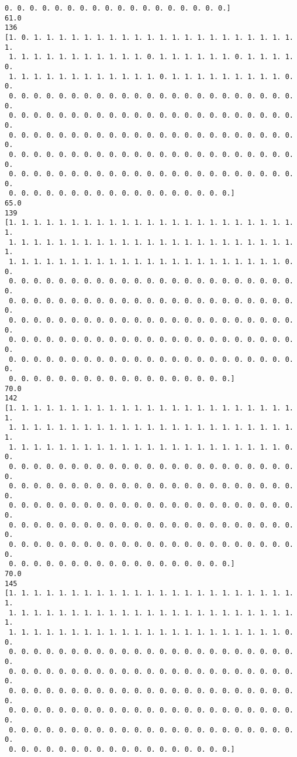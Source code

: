 \documentclass[11pt]{article}
\begin{document}
\begin{Verbatim}[commandchars=\\\{\}]
 0. 0. 0. 0. 0. 0. 0. 0. 0. 0. 0. 0. 0. 0. 0. 0. 0. 0.]
61.0
136
[1. 0. 1. 1. 1. 1. 1. 1. 1. 1. 1. 1. 1. 1. 1. 1. 1. 1. 1. 1. 1. 1. 1. 1.
 1. 1. 1. 1. 1. 1. 1. 1. 1. 1. 1. 0. 1. 1. 1. 1. 1. 1. 0. 1. 1. 1. 1. 0.
 1. 1. 1. 1. 1. 1. 1. 1. 1. 1. 1. 1. 0. 1. 1. 1. 1. 1. 1. 1. 1. 1. 0. 0.
 0. 0. 0. 0. 0. 0. 0. 0. 0. 0. 0. 0. 0. 0. 0. 0. 0. 0. 0. 0. 0. 0. 0. 0.
 0. 0. 0. 0. 0. 0. 0. 0. 0. 0. 0. 0. 0. 0. 0. 0. 0. 0. 0. 0. 0. 0. 0. 0.
 0. 0. 0. 0. 0. 0. 0. 0. 0. 0. 0. 0. 0. 0. 0. 0. 0. 0. 0. 0. 0. 0. 0. 0.
 0. 0. 0. 0. 0. 0. 0. 0. 0. 0. 0. 0. 0. 0. 0. 0. 0. 0. 0. 0. 0. 0. 0. 0.
 0. 0. 0. 0. 0. 0. 0. 0. 0. 0. 0. 0. 0. 0. 0. 0. 0. 0. 0. 0. 0. 0. 0. 0.
 0. 0. 0. 0. 0. 0. 0. 0. 0. 0. 0. 0. 0. 0. 0. 0. 0. 0.]
65.0
139
[1. 1. 1. 1. 1. 1. 1. 1. 1. 1. 1. 1. 1. 1. 1. 1. 1. 1. 1. 1. 1. 1. 1. 1.
 1. 1. 1. 1. 1. 1. 1. 1. 1. 1. 1. 1. 1. 1. 1. 1. 1. 1. 1. 1. 1. 1. 1. 1.
 1. 1. 1. 1. 1. 1. 1. 1. 1. 1. 1. 1. 1. 1. 1. 1. 1. 1. 1. 1. 1. 1. 0. 0.
 0. 0. 0. 0. 0. 0. 0. 0. 0. 0. 0. 0. 0. 0. 0. 0. 0. 0. 0. 0. 0. 0. 0. 0.
 0. 0. 0. 0. 0. 0. 0. 0. 0. 0. 0. 0. 0. 0. 0. 0. 0. 0. 0. 0. 0. 0. 0. 0.
 0. 0. 0. 0. 0. 0. 0. 0. 0. 0. 0. 0. 0. 0. 0. 0. 0. 0. 0. 0. 0. 0. 0. 0.
 0. 0. 0. 0. 0. 0. 0. 0. 0. 0. 0. 0. 0. 0. 0. 0. 0. 0. 0. 0. 0. 0. 0. 0.
 0. 0. 0. 0. 0. 0. 0. 0. 0. 0. 0. 0. 0. 0. 0. 0. 0. 0. 0. 0. 0. 0. 0. 0.
 0. 0. 0. 0. 0. 0. 0. 0. 0. 0. 0. 0. 0. 0. 0. 0. 0. 0.]
70.0
142
[1. 1. 1. 1. 1. 1. 1. 1. 1. 1. 1. 1. 1. 1. 1. 1. 1. 1. 1. 1. 1. 1. 1. 1.
 1. 1. 1. 1. 1. 1. 1. 1. 1. 1. 1. 1. 1. 1. 1. 1. 1. 1. 1. 1. 1. 1. 1. 1.
 1. 1. 1. 1. 1. 1. 1. 1. 1. 1. 1. 1. 1. 1. 1. 1. 1. 1. 1. 1. 1. 1. 0. 0.
 0. 0. 0. 0. 0. 0. 0. 0. 0. 0. 0. 0. 0. 0. 0. 0. 0. 0. 0. 0. 0. 0. 0. 0.
 0. 0. 0. 0. 0. 0. 0. 0. 0. 0. 0. 0. 0. 0. 0. 0. 0. 0. 0. 0. 0. 0. 0. 0.
 0. 0. 0. 0. 0. 0. 0. 0. 0. 0. 0. 0. 0. 0. 0. 0. 0. 0. 0. 0. 0. 0. 0. 0.
 0. 0. 0. 0. 0. 0. 0. 0. 0. 0. 0. 0. 0. 0. 0. 0. 0. 0. 0. 0. 0. 0. 0. 0.
 0. 0. 0. 0. 0. 0. 0. 0. 0. 0. 0. 0. 0. 0. 0. 0. 0. 0. 0. 0. 0. 0. 0. 0.
 0. 0. 0. 0. 0. 0. 0. 0. 0. 0. 0. 0. 0. 0. 0. 0. 0. 0.]
70.0
145
[1. 1. 1. 1. 1. 1. 1. 1. 1. 1. 1. 1. 1. 1. 1. 1. 1. 1. 1. 1. 1. 1. 1. 1.
 1. 1. 1. 1. 1. 1. 1. 1. 1. 1. 1. 1. 1. 1. 1. 1. 1. 1. 1. 1. 1. 1. 1. 1.
 1. 1. 1. 1. 1. 1. 1. 1. 1. 1. 1. 1. 1. 1. 1. 1. 1. 1. 1. 1. 1. 1. 0. 0.
 0. 0. 0. 0. 0. 0. 0. 0. 0. 0. 0. 0. 0. 0. 0. 0. 0. 0. 0. 0. 0. 0. 0. 0.
 0. 0. 0. 0. 0. 0. 0. 0. 0. 0. 0. 0. 0. 0. 0. 0. 0. 0. 0. 0. 0. 0. 0. 0.
 0. 0. 0. 0. 0. 0. 0. 0. 0. 0. 0. 0. 0. 0. 0. 0. 0. 0. 0. 0. 0. 0. 0. 0.
 0. 0. 0. 0. 0. 0. 0. 0. 0. 0. 0. 0. 0. 0. 0. 0. 0. 0. 0. 0. 0. 0. 0. 0.
 0. 0. 0. 0. 0. 0. 0. 0. 0. 0. 0. 0. 0. 0. 0. 0. 0. 0. 0. 0. 0. 0. 0. 0.
 0. 0. 0. 0. 0. 0. 0. 0. 0. 0. 0. 0. 0. 0. 0. 0. 0. 0.]

\end{Verbatim}
\end{document}
